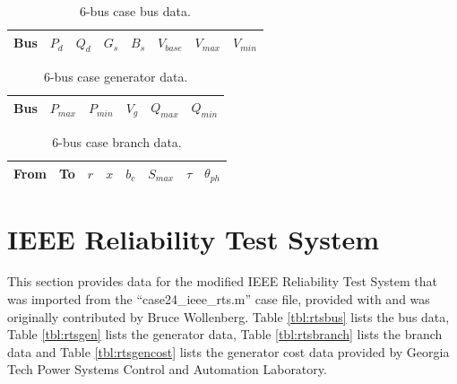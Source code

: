 
\begin{table}[h]
\caption{6-bus case bus data.}
\label{tbl:case6ww_bus}
\begin{center}
\begin{tabular}{c|c|c|c|c|c|c|c}
\hline
Bus &$P_d$ &$Q_d$ &$G_s$ &$B_s$ &$V_{base}$ &$V_{max}$ &$V_{min}$\\
\hline\hline

\hline
\end{tabular}
\end{center}
\end{table}

\begin{table}[h]
\caption{6-bus case generator data.}
\label{tbl:case6ww_gen}
\begin{center}
\begin{tabular}{c|c|c|c|c|c}
\hline
Bus &$P_{max}$ &$P_{min}$ &$V_g$ &$Q_{max}$ &$Q_{min}$\\
\hline\hline

\hline
\end{tabular}
\end{center}
\end{table}

\begin{table}[h]
\caption{6-bus case branch data.}
\label{tbl:case6ww_branch}
\begin{center}
\begin{tabular}{c|c|c|c|c|c|c|c}
\hline
From &To &$r$ &$x$ &$b_c$ &$S_{max}$ &$\tau$ &$\theta_{ph}$\\
\hline\hline

\hline
\end{tabular}
\end{center}
\end{table}

\section{IEEE Reliability Test System}
\label{adx:ieee_rts}
This section provides data for the modified IEEE Reliability Test System that
was imported from the ``case24\_ieee\_rts.m'' case file, provided with \matpower
and was originally contributed by Bruce Wollenberg.
Table \ref{tbl:rtsbus} lists the bus data, Table \ref{tbl:rtsgen} lists the
generator data, Table \ref{tbl:rtsbranch} lists the branch data and Table
\ref{tbl:rtsgencost} lists the generator cost data provided by Georgia Tech
Power Systems Control and Automation Laboratory.

